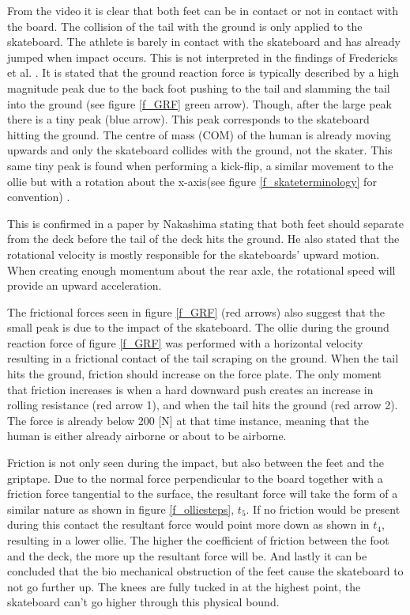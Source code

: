 From the video it is clear that both feet can be in contact or not in contact with the board. The collision of the tail with the ground is only applied to the skateboard. The athlete is barely in contact with the skateboard and has already jumped when impact occurs. This is not interpreted in the findings of Fredericks et al. \cite{frederick_biomechanics_2006}. It is stated that the ground reaction force is typically described by a high magnitude peak due to the back foot pushing to the tail and slamming the tail into the ground (see figure \ref{f_GRF} green arrow). Though, after the large peak there is a tiny peak (blue arrow). This peak corresponds to the skateboard hitting the ground. The centre of mass (COM) of the human is already moving upwards and only the skateboard collides with the ground, not the skater. This same tiny peak is found when performing a kick-flip, a similar movement to the ollie but with a rotation about the x-axis(see figure \ref{f_skateterminology} for convention) \cite{determan_kinetics_2006}. 

This is confirmed in a paper by Nakashima \cite{nakashima_simulation_2021} stating that both feet should separate from the deck before the tail of the deck hits the ground. He also stated that the rotational velocity is mostly responsible for the skateboards' upward motion. When creating enough momentum about the rear axle, the rotational speed will provide an upward acceleration. 

The frictional forces seen in figure \ref{f_GRF} (red arrows) also suggest that the small peak is due to the impact of the skateboard. The ollie during the ground reaction force of figure \ref{f_GRF} was performed with a horizontal velocity resulting in a frictional contact of the tail scraping on the ground. When the tail hits the ground, friction should increase on the force plate. The only moment that friction increases is when a hard downward push creates an increase in rolling resistance (red arrow 1), and when the tail hits the ground (red arrow 2). The force is already below 200 [N] at that time instance, meaning that the human is either already airborne or about to be airborne.

Friction is not only seen during the impact, but also between the feet and the griptape. Due to the normal force perpendicular to the board together with a friction force tangential to the surface, the resultant force will take the form of a similar nature as shown in figure \ref{f_olliesteps}, $t_5$. If no friction would be present during this contact the resultant force would point more down as shown in $t_4$, resulting in a lower ollie. The higher the coefficient of friction between the foot and the deck, the more up the resultant force will be. And lastly it can be concluded that the bio mechanical obstruction of the feet cause the skateboard to not go further up. The knees are fully tucked in at the highest point, the skateboard can't go higher through this physical bound. 

